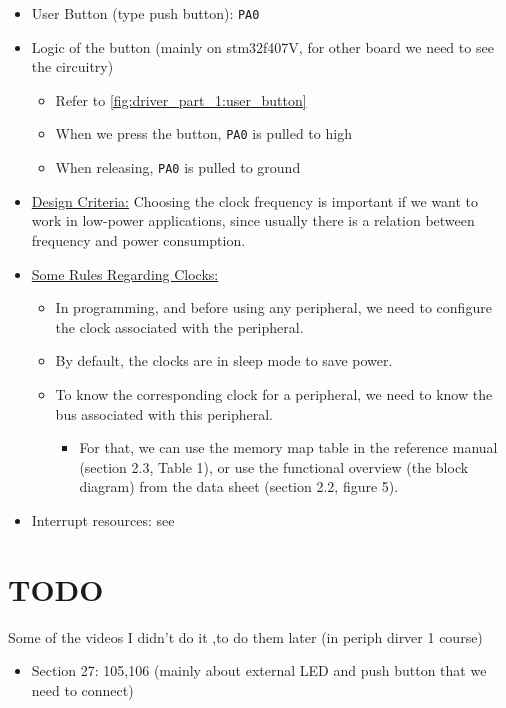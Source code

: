 \begin{itemize}

\item User Button (type push button): \verb	|PA0|	

\item Logic of the button (mainly on stm32f407V, for other board we need to see the circuitry)

	\begin{itemize}
	
	\item Refer to \autoref{fig:driver_part_1:user_button}
	
	\item When we press the button, \verb|PA0| is pulled to high
	
	\item When releasing, \verb|PA0| is pulled to ground
	\end{itemize}	 
	

\end{itemize}

\begin{itemize}


\item \underline{Design Criteria:} Choosing the clock frequency is important if we want to work in low-power applications, since usually there is a relation between frequency and power consumption.

\item \underline{Some Rules Regarding Clocks:}

\begin{itemize}
    
    \item In programming, and before using any peripheral, we need to configure the clock associated with the peripheral.

    \item By default, the clocks are in sleep mode to save power.

    \item To know the corresponding clock for a peripheral, we need to know the bus associated with this peripheral.

    \begin{itemize}
        \item For that, we can use the memory map table in the reference manual (section 2.3, Table 1), or use the functional overview (the block diagram) from the data sheet (section 2.2, figure 5).
    \end{itemize}
    
\end{itemize}

\item Interrupt resources: see 

\end{itemize}

\section{TODO}

Some of the videos I didn't do it ,to do them later (in periph dirver 1 course)

\begin{itemize}

\item Section 27: 105,106 (mainly about external LED and push button that we need to connect)

\end{itemize}

